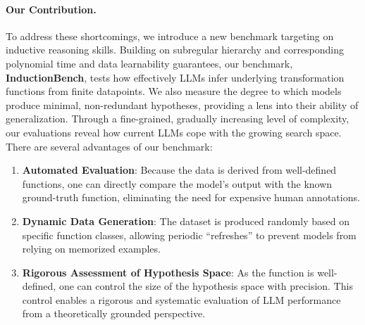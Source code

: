 \paragraph{Our Contribution.} To address these shortcomings, we introduce a new benchmark targeting on inductive reasoning skills. Building on subregular hierarchy and corresponding polynomial time and data learnability guarantees, our benchmark, \textbf{InductionBench}, tests how effectively LLMs infer underlying transformation functions from finite datapoints. We also measure the degree to which models produce minimal, non-redundant hypotheses, providing a lens into their ability of generalization. Through a fine-grained, gradually increasing level of complexity, our evaluations reveal how current LLMs cope with the growing search space. There are several advantages of our benchmark:
\begin{enumerate}
    \item \textbf{Automated Evaluation}: Because the data is derived from well-defined functions, one can directly compare the model's output with the known ground-truth function, eliminating the need for expensive human annotations. 
    \item \textbf{Dynamic Data Generation}: The dataset is produced randomly based on specific function classes, allowing periodic ``refreshes'' to prevent models from relying on memorized examples.
    \item \textbf{Rigorous Assessment of Hypothesis Space}: As the function is well-defined, one can control the size of the hypothesis space with precision. This control enables a rigorous and systematic evaluation of LLM performance from a theoretically grounded perspective.
\end{enumerate}